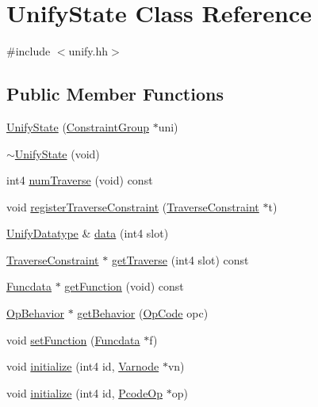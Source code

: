\hypertarget{class_unify_state}{}\section{Unify\+State Class Reference}
\label{class_unify_state}


{\ttfamily \#include $<$unify.\+hh$>$}

\subsection*{Public Member Functions}
\begin{DoxyCompactItemize}
\item 
\mbox{\hyperlink{class_unify_state_ab5d4b205eeaa2371dd3e72ac624554b9}{Unify\+State}} (\mbox{\hyperlink{class_constraint_group}{Constraint\+Group}} $\ast$uni)
\item 
\mbox{\hyperlink{class_unify_state_aca7f5a5c5ab880a3f68bb33545305af3}{$\sim$\+Unify\+State}} (void)
\item 
int4 \mbox{\hyperlink{class_unify_state_aee8feffae4fce2d1c61b8ebc6e85ffab}{num\+Traverse}} (void) const
\item 
void \mbox{\hyperlink{class_unify_state_a6de67ee3f7c332a0598e23f9595bd697}{register\+Traverse\+Constraint}} (\mbox{\hyperlink{class_traverse_constraint}{Traverse\+Constraint}} $\ast$t)
\item 
\mbox{\hyperlink{class_unify_datatype}{Unify\+Datatype}} \& \mbox{\hyperlink{class_unify_state_a56696c23a8dff1f9451a9bcc2d17b7e4}{data}} (int4 slot)
\item 
\mbox{\hyperlink{class_traverse_constraint}{Traverse\+Constraint}} $\ast$ \mbox{\hyperlink{class_unify_state_a924f75674fb194162125e16607b88585}{get\+Traverse}} (int4 slot) const
\item 
\mbox{\hyperlink{class_funcdata}{Funcdata}} $\ast$ \mbox{\hyperlink{class_unify_state_a30bf553bae64a3d1503b8fce5ce5f6b1}{get\+Function}} (void) const
\item 
\mbox{\hyperlink{class_op_behavior}{Op\+Behavior}} $\ast$ \mbox{\hyperlink{class_unify_state_a53e0383888fa32afa3d22a13eec10033}{get\+Behavior}} (\mbox{\hyperlink{opcodes_8hh_abeb7dfb0e9e2b3114e240a405d046ea7}{Op\+Code}} opc)
\item 
void \mbox{\hyperlink{class_unify_state_a4459a02f1e3d080675f78a93f32b9195}{set\+Function}} (\mbox{\hyperlink{class_funcdata}{Funcdata}} $\ast$f)
\item 
void \mbox{\hyperlink{class_unify_state_a25a26aac2d13be866fa6e7d35ae022b4}{initialize}} (int4 id, \mbox{\hyperlink{class_varnode}{Varnode}} $\ast$vn)
\item 
void \mbox{\hyperlink{class_unify_state_a3f727743d0832da95a691d3d2153d180}{initialize}} (int4 id, \mbox{\hyperlink{class_pcode_op}{Pcode\+Op}} $\ast$op)
\end{DoxyCompactItemize}


